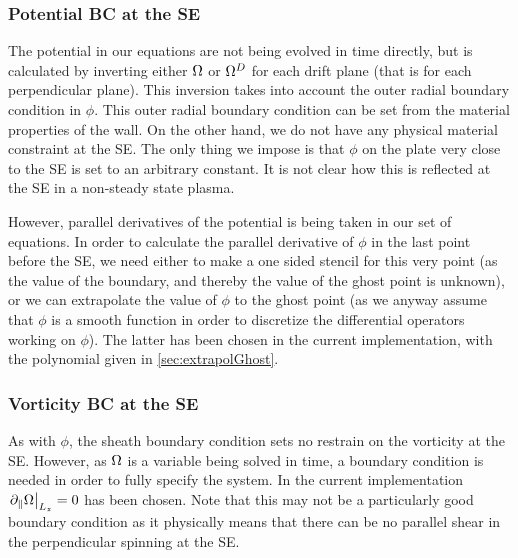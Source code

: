 \subsubsection{Potential BC at the SE}
%
The potential in our equations are not being evolved in time directly, but is calculated by inverting either $\Omega$ or $\Omega^D$ for each drift plane (that is for each perpendicular plane).
This inversion takes into account the outer radial boundary condition in $\phi$.
This outer radial boundary condition can be set from the material properties of the wall.
On the other hand, we do not have any physical material constraint at the SE.
The only thing we impose is that $\phi$ on the plate very close to the SE is set to an arbitrary constant.
 It is not clear how this is reflected at the SE in a non-steady state plasma.

However, parallel derivatives of the potential is being taken in our set of equations.
In order to calculate the parallel derivative of $\phi$ in the last point before the SE, we need either to make a one sided stencil for this very point (as the value of the boundary, and thereby the value of the ghost point is unknown), or we can extrapolate the value of $\phi$ to the ghost point (as we anyway assume that $\phi$ is a smooth function in order to discretize the differential operators working on $\phi$).
The latter has been chosen in the current implementation, with the polynomial given in \cref{sec:extrapolGhost}.

\subsubsection{Vorticity BC at the SE}
As with $\phi$, the sheath boundary condition sets no restrain on the vorticity at the SE.
However, as $\Omega$ is a variable being solved in time, a boundary condition is needed in order to fully specify the system.
In the current implementation $\left. \partial_\| \Omega \right|_{L_z} = 0$ has been chosen.
Note that this may not be a particularly good boundary condition as it physically means that there can be no parallel shear in the perpendicular spinning at the SE.

